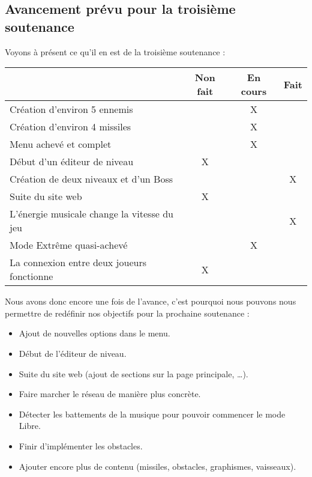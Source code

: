\documentclass[12pt,a4paper]{article}
\begin{document}
		\subsection{Avancement prévu pour la troisième soutenance}
		Voyons à présent ce qu'il en est de la troisième soutenance :
		\begin{center}
			\begin{tabular}{|p{9cm}|c|c|c|}
			\hline
				& Non fait & En cours & Fait \\ \hline
				Création d'environ 5 ennemis & & X & \\ \hline
				Création d'environ 4 missiles & & X & \\ \hline
				Menu achevé et complet & & X & \\ \hline
				Début d'un éditeur de niveau & X & & \\ \hline
				Création de deux niveaux et d'un Boss & & & X\\ \hline
				Suite du site web & X & & \\ \hline
				L'énergie musicale change la vitesse du jeu & & & X\\ \hline
				Mode Extrême quasi-achevé & & X &\\ \hline
				La connexion entre deux joueurs fonctionne & X & & \\ \hline
			\end{tabular}
		\end{center}
		Nous avons donc encore une fois de l'avance, c'est pourquoi nous pouvons nous permettre de redéfinir nos objectifs pour la prochaine soutenance :
		\begin{itemize}
			\item Ajout de nouvelles options dans le menu.
			\item Début de l'éditeur de niveau.
			\item Suite du site web (ajout de sections sur la page principale, \ldots).
			\item Faire marcher le réseau de manière plus concrète.
			\item Détecter les battements de la musique pour pouvoir commencer le mode Libre.
			\item Finir d'implémenter les obstacles.
			\item Ajouter encore plus de contenu (missiles, obstacles, graphismes, vaisseaux).
		\end{itemize}
	\newpage
\end{document}
